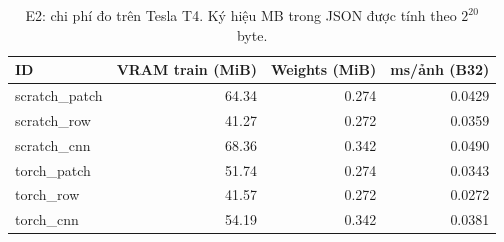 \begin{table}[htbp]
\centering\small
\caption{E2: chi phí đo trên Tesla T4. Ký hiệu MB trong JSON được tính theo $2^{20}$ byte.}\label{tab:costE2}
\begin{lrbox}{\reporttable}\begin{tabular}{lrrr}
\toprule
ID & VRAM train (MiB) & Weights (MiB) & ms/ảnh (B32) \\
\midrule
scratch\_patch & 64.34 & 0.274 & 0.0429 \\
scratch\_row & 41.27 & 0.272 & 0.0359 \\
scratch\_cnn & 68.36 & 0.342 & 0.0490 \\
torch\_patch & 51.74 & 0.274 & 0.0343 \\
torch\_row & 41.57 & 0.272 & 0.0272 \\
torch\_cnn & 54.19 & 0.342 & 0.0381 \\
\bottomrule
\end{tabular}\end{lrbox}
\ifdim\wd\reporttable>\linewidth\resizebox{\linewidth}{!}{\usebox{\reporttable}}\else\usebox{\reporttable}\fi
\end{table}
